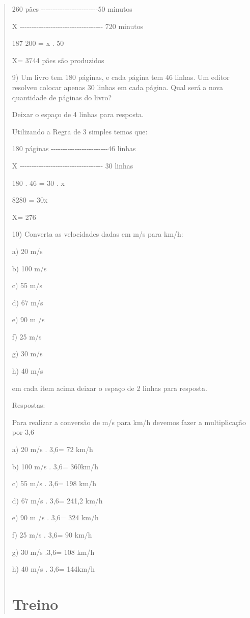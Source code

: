 \begin{quote}
\begin{escolha}
260 pães
-\/-\/-\/-\/-\/-\/-\/-\/-\/-\/-\/-\/-\/-\/-\/-\/-\/-\/-\/-\/-\/-\/-\/-50
minutos

X
-\/-\/-\/-\/-\/-\/-\/-\/-\/-\/-\/-\/-\/-\/-\/-\/-\/-\/-\/-\/-\/-\/-\/-\/-\/-\/-\/-\/-\/-\/-\/-\/-\/-\/-
720 minutos

187 200 = x . 50

X= 3744 pães são produzidos

9) Um livro tem 180 páginas, e cada página tem 46 linhas. Um editor
resolveu colocar apenas 30 linhas em cada página. Qual será a nova
quantidade de páginas do livro?

Deixar o espaço de 4 linhas para resposta.

Utilizando a Regra de 3 simples temos que:

180 páginas
-\/-\/-\/-\/-\/-\/-\/-\/-\/-\/-\/-\/-\/-\/-\/-\/-\/-\/-\/-\/-\/-\/-\/-46
linhas

X
-\/-\/-\/-\/-\/-\/-\/-\/-\/-\/-\/-\/-\/-\/-\/-\/-\/-\/-\/-\/-\/-\/-\/-\/-\/-\/-\/-\/-\/-\/-\/-\/-\/-\/-
30 linhas

180 . 46 = 30 . x

8280 = 30x

X= 276

10) Converta as velocidades dadas em m/s para km/h:

a) 20 m/s

b) 100 m/s

c) 55 m/s

d) 67 m/s

e) 90 m /s

f) 25 m/s

g) 30 m/s

h) 40 m/s

em cada item acima deixar o espaço de 2 linhas para resposta.

Respostas:

Para realizar a conversão de m/s para km/h devemos fazer a multiplicação
por 3,6

a) 20 m/s . 3,6= 72 km/h

b) 100 m/s . 3,6= 360km/h

c) 55 m/s . 3,6= 198 km/h

d) 67 m/s . 3,6= 241,2 km/h

e) 90 m /s . 3,6= 324 km/h

f) 25 m/s . 3,6= 90 km/h

g) 30 m/s .3,6= 108 km/h

h) 40 m/s . 3,6= 144km/h

\section{Treino}


\end{escolha}
\end{quote}
